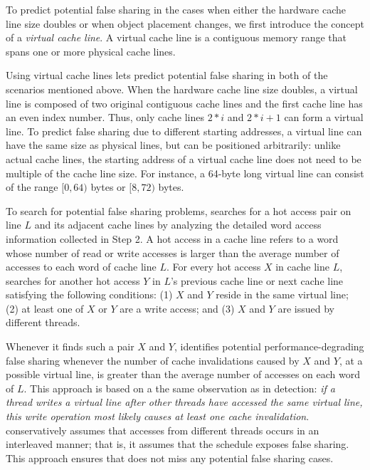 To predict potential false sharing in the cases when either the hardware cache line size doubles or when object placement changes, we first 
introduce the concept of a \emph{virtual cache line}.  A virtual cache line
is a contiguous memory range that spans one or more physical cache 
lines.

Using virtual cache lines lets \Predator{} predict potential false sharing in both of the scenarios mentioned above. When the hardware cache line size doubles, a virtual line is
composed of two original contiguous cache lines and the first cache
line has an even index number.  Thus, only cache lines $2*i$ and
$2*i+1$ can form a virtual line.  To predict false sharing due to different starting
addresses, a virtual line can have the same size as physical lines,
but can be positioned arbitrarily: unlike actual cache lines, the
starting address of a virtual cache line does not need to be multiple
of the cache line size.  For instance, a 64-byte long virtual line can
consist of the range $[0,64)$ bytes or $[8,72)$ bytes.

To search for potential false sharing problems, 
\Predator{} searches for a hot access pair on line $L$ and its adjacent cache lines 
by analyzing the detailed word access information collected in Step 2. 
A hot access in a cache line refers to a word whose number of read or write accesses 
is larger than the average number of accesses to each word of cache line $L$.
For every hot access $X$ in cache line $L$, \Predator{} searches for another
hot access $Y$ in $L$'s previous cache line or next cache line satisfying
the following conditions: 
(1) $X$ and $Y$ reside in the same virtual line;
(2) at least one of $X$ or $Y$ are a write access; and 
(3) $X$ and $Y$ are issued by different threads.

 
Whenever it finds such a pair $X$ and $Y$, 
\Predator{} identifies potential performance-degrading false sharing whenever
 the number of cache invalidations caused by $X$ and $Y$, at a possible virtual line, 
is greater than the average number of accesses on each word of $L$. 
This approach is based on a the same observation as in detection:
\emph{if a thread writes a virtual line after other threads 
have accessed the same virtual line, this write operation most likely causes at least one cache 
invalidation}. 
\Predator{} conservatively assumes that accesses from different threads occurs in an interleaved manner; that is, it assumes that the schedule exposes false sharing.
This approach ensures that \Predator{} does not miss any potential false sharing cases.
  
